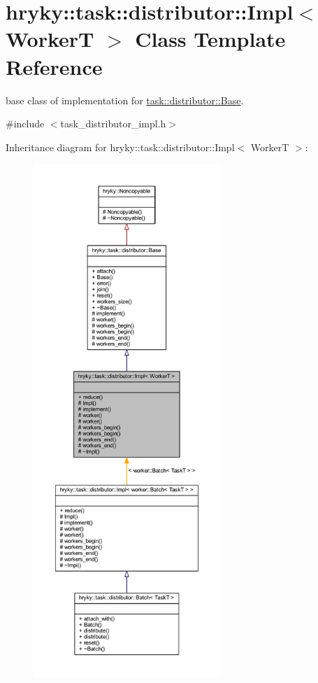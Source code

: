 \hypertarget{classhryky_1_1task_1_1distributor_1_1_impl}{\section{hryky\-:\-:task\-:\-:distributor\-:\-:Impl$<$ Worker\-T $>$ Class Template Reference}
\label{classhryky_1_1task_1_1distributor_1_1_impl}
}


base class of implementation for \hyperlink{classhryky_1_1task_1_1distributor_1_1_base}{task\-::distributor\-::\-Base}.  




{\ttfamily \#include $<$task\-\_\-distributor\-\_\-impl.\-h$>$}



Inheritance diagram for hryky\-:\-:task\-:\-:distributor\-:\-:Impl$<$ Worker\-T $>$\-:
\nopagebreak
\begin{figure}[H]
\begin{center}
\leavevmode
\includegraphics[height=550pt]{classhryky_1_1task_1_1distributor_1_1_impl__inherit__graph}
\end{center}
\end{figure}

